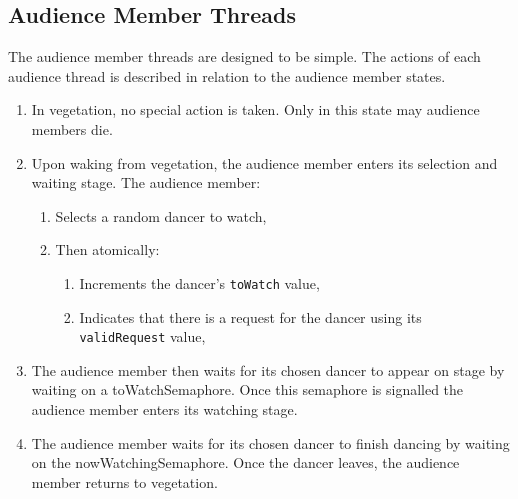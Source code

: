 \documentclass[12pt,a4paper]{scrartcl}
\begin{document}
\subsection{Audience Member Threads}
The audience member threads are designed to be simple.
The actions of each audience thread is described in relation to the audience member states.
\begin{enumerate}
    \item In vegetation, no special action is taken. Only in this state may audience members die.
    \item Upon waking from vegetation, the audience member enters its selection and waiting stage. The audience member:
    \begin{enumerate}
        \item Selects a random dancer to watch,
        \item Then atomically:
        \begin{enumerate}
            \item Increments the dancer's \texttt{toWatch} value,
            \item Indicates that there is a request for the dancer using its \texttt{validRequest} value,
        \end{enumerate}
    \end{enumerate}
    \item The audience member then waits for its chosen dancer to appear on stage by waiting on a toWatchSemaphore.
          Once this semaphore is signalled the audience member enters its watching stage.
    \item The audience member waits for its chosen dancer to finish dancing by waiting on the nowWatchingSemaphore.
          Once the dancer leaves, the audience member returns to vegetation.
\end{enumerate}
\end{document}

